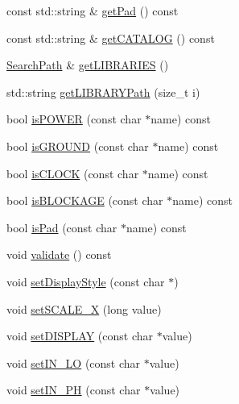 \begin{DoxyCompactItemize}
\item 
const std\-::string \& \hyperlink{classCRL_1_1Environment_ab5332d750d63f3f6947bc7888af4d402}{get\-Pad} () const 
\item 
const std\-::string \& \hyperlink{classCRL_1_1Environment_aa1fae32236875ba6f3a4f409e4231020}{get\-C\-A\-T\-A\-L\-O\-G} () const 
\item 
\hyperlink{classCRL_1_1SearchPath}{Search\-Path} \& \hyperlink{classCRL_1_1Environment_acf7a3bc42cfb4b98f1da859ed27ca97e}{get\-L\-I\-B\-R\-A\-R\-I\-E\-S} ()
\item 
std\-::string \hyperlink{classCRL_1_1Environment_afe29d7cab0055cabb7667eabcbdd32db}{get\-L\-I\-B\-R\-A\-R\-Y\-Path} (size\-\_\-t i)
\item 
bool \hyperlink{classCRL_1_1Environment_ab639f914029177808ffa9ba933ec8c4d}{is\-P\-O\-W\-E\-R} (const char $\ast$name) const 
\item 
bool \hyperlink{classCRL_1_1Environment_a486245c4527ac3beca23900b537080c0}{is\-G\-R\-O\-U\-N\-D} (const char $\ast$name) const 
\item 
bool \hyperlink{classCRL_1_1Environment_aeee19c6b2415b11555e9e122420aac6b}{is\-C\-L\-O\-C\-K} (const char $\ast$name) const 
\item 
bool \hyperlink{classCRL_1_1Environment_aab162c95e9d75f825f7471ead130985a}{is\-B\-L\-O\-C\-K\-A\-G\-E} (const char $\ast$name) const 
\item 
bool \hyperlink{classCRL_1_1Environment_a9ea8161e491a4c8dfaeff9ebfe02b679}{is\-Pad} (const char $\ast$name) const 
\item 
void \hyperlink{classCRL_1_1Environment_a73fbaa112f66b6c334c549ff594b1fb7}{validate} () const 
\item 
void \hyperlink{classCRL_1_1Environment_a85fa721541a39571c3ade06992035bad}{set\-Display\-Style} (const char $\ast$)
\item 
void \hyperlink{classCRL_1_1Environment_ad14d519b0a4c964d7a786739499571dd}{set\-S\-C\-A\-L\-E\-\_\-\-X} (long value)
\item 
void \hyperlink{classCRL_1_1Environment_a69416219076a00900f58d0d5e0ac55a9}{set\-D\-I\-S\-P\-L\-A\-Y} (const char $\ast$value)
\item 
void \hyperlink{classCRL_1_1Environment_ad204e8f425d3a35bba494a60d4b4ff69}{set\-I\-N\-\_\-\-L\-O} (const char $\ast$value)
\item 
void \hyperlink{classCRL_1_1Environment_a62965d987f17d2853afd44004ff20b1b}{set\-I\-N\-\_\-\-P\-H} (const char $\ast$value)
\item 

\end{DoxyCompactItemize}
